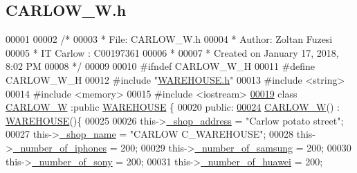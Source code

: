 \hypertarget{_c_a_r_l_o_w___w_8h_source}{}\subsection{C\+A\+R\+L\+O\+W\+\_\+\+W.\+h}

\begin{DoxyCode}
00001 
00002 \textcolor{comment}{/* }
00003 \textcolor{comment}{ * File:   CARLOW\_W.h}
00004 \textcolor{comment}{ * Author: Zoltan Fuzesi}
00005 \textcolor{comment}{ * IT Carlow : C00197361}
00006 \textcolor{comment}{ *}
00007 \textcolor{comment}{ * Created on January 17, 2018, 8:02 PM}
00008 \textcolor{comment}{ */}
00009 
00010 \textcolor{preprocessor}{#ifndef CARLOW\_W\_H}
00011 \textcolor{preprocessor}{#define CARLOW\_W\_H}
00012 \textcolor{preprocessor}{#include "\hyperlink{_w_a_r_e_h_o_u_s_e_8h}{WAREHOUSE.h}"}
00013 \textcolor{preprocessor}{#include <string>}
00014 \textcolor{preprocessor}{#include <memory>}
00015 \textcolor{preprocessor}{#include <iostream>}
\hypertarget{_c_a_r_l_o_w___w_8h_source.tex_l00019}{}\hyperlink{class_c_a_r_l_o_w___w}{00019} \textcolor{keyword}{class }\hyperlink{class_c_a_r_l_o_w___w}{CARLOW\_W} :\textcolor{keyword}{public} \hyperlink{class_w_a_r_e_h_o_u_s_e}{WAREHOUSE} \{
00020 \textcolor{keyword}{public}:
\hypertarget{_c_a_r_l_o_w___w_8h_source.tex_l00024}{}\hyperlink{class_c_a_r_l_o_w___w_a8ae6ca6f4db7ea5240322fd27824c55a_a8ae6ca6f4db7ea5240322fd27824c55a}{00024}     \hyperlink{class_c_a_r_l_o_w___w_a8ae6ca6f4db7ea5240322fd27824c55a_a8ae6ca6f4db7ea5240322fd27824c55a}{CARLOW\_W}() : \hyperlink{class_w_a_r_e_h_o_u_s_e}{WAREHOUSE}()\{
00025         
00026         this->\hyperlink{class_c_a_r_l_o_w___w_acaa886b26f5a60d500f13709340d34cf_acaa886b26f5a60d500f13709340d34cf}{\_shop\_address} = \textcolor{stringliteral}{"Carlow potato street"};
00027         this->\hyperlink{class_c_a_r_l_o_w___w_ad3ae4ca82f06287d8ad5bec07a43561a_ad3ae4ca82f06287d8ad5bec07a43561a}{\_shop\_name} = \textcolor{stringliteral}{"CARLOW C\_WAREHOUSE"};
00028         this->\hyperlink{class_c_a_r_l_o_w___w_aff9e9a986b6390d6fa51f52d43a8c0e8_aff9e9a986b6390d6fa51f52d43a8c0e8}{\_number\_of\_iphones} = 200;
00029         this->\hyperlink{class_c_a_r_l_o_w___w_ae47f54289c630e38341ce8b2c8decf0f_ae47f54289c630e38341ce8b2c8decf0f}{\_number\_of\_samsung} = 200;
00030         this->\hyperlink{class_c_a_r_l_o_w___w_a080de2e63290db84a0b9898682b74f6e_a080de2e63290db84a0b9898682b74f6e}{\_number\_of\_sony} = 200;
00031         this->\hyperlink{class_c_a_r_l_o_w___w_acc2837ed943bb51134e5878e818970fd_acc2837ed943bb51134e5878e818970fd}{\_number\_of\_huawei} = 200;

\end{DoxyCode}
